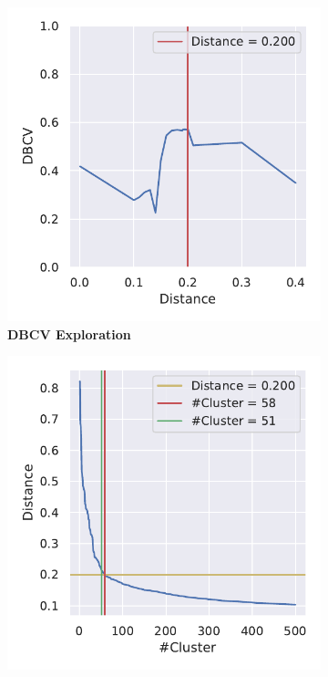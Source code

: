 \begin{figure}
    \begin{adjustbox}{minipage=\dimexpr{}\fboxrule,fbox}
        \begin{subfigure}[b]{0.475\textwidth}
            \includegraphics[width=\textwidth]{PCA/Cluster_DBCV_Segment_4.pdf}
            \caption[\Acrshort{DBCV} Exploration]{\textbf{\Acrshort{DBCV} Exploration}}
            \label{subfig:PCA_Cluster_DBCV_Explo_4}
        \end{subfigure}
        \hfill
        \begin{subfigure}[b]{0.475\textwidth}
            \includegraphics[width=\textwidth]{PCA/Cluster_Elbow_DBCV_Segment_4.pdf}

\end{subfigure}
\end{adjustbox}
\end{figure}
